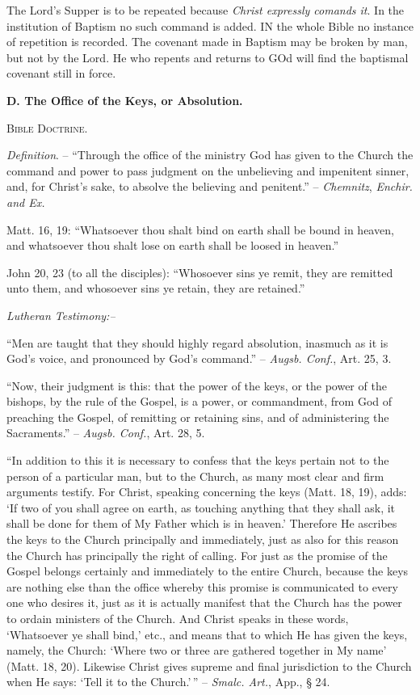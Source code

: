 \documentclass[
]{book}
\def\igobble#1{}
\begin{document}
The Lord's Supper is to be repeated because \emph{Christ expressly comands it}. In the institution of Baptism no such command is added. IN the whole Bible no instance of repetition is recorded. The covenant made in Baptism may be broken by man, but not by the Lord. He who repents and returns to GOd will find the baptismal covenant still in force.

\begin{center}
\textbf{D.  The Office of the Keys, or Absolution.}

\textsc{Bible Doctrine.}
\end{center}

\emph{Definition}. -- ``Through the office\index{Keys, Office of!zzzzz@\igobble|seealso{Absolution}} of the ministry God has given to the Church the command and power to pass judgment on the unbelieving and impenitent sinner, and, for Christ's sake, to absolve the believing and penitent.'' -- \emph{Chemnitz}, \emph{Enchir. and Ex.}

Matt. 16, 19: ``Whatsoever thou shalt bind on earth shall be bound in heaven, and whatsoever thou shalt lose on earth shall be loosed in heaven.''

John 20, 23 (to all the disciples): ``Whosoever sins ye remit, they are remitted unto them, and whosoever sins ye retain, they are retained.''

\begin{center}
\textsl{Lutheran Testimony:--}
\end{center}

``Men are taught that they should highly regard absolution, inasmuch as it is God's voice, and pronounced by God's command.'' -- \emph{Augsb. Conf.}, Art. 25, 3.

``Now, their judgment is this: that the power of the keys, or the power of the bishops, by the rule of the Gospel, is a power, or commandment, from God of preaching the Gospel, of remitting or retaining sins, and of administering the Sacraments.'' -- \emph{Augsb. Conf.}, Art. 28, 5.

``In addition to this it is necessary to confess that the keys pertain not to the person of a particular man, but to the Church, as many most clear and firm arguments testify. For Christ, speaking concerning the keys (Matt. 18, 19), adds: `If two of you shall agree on earth, as touching anything that they shall ask, it shall be done for them of My Father which is in heaven.' Therefore He ascribes the keys to the Church principally and immediately, just as also for this reason the Church has principally the right of calling. For just as the promise of the Gospel belongs certainly and immediately to the entire Church, because the keys are nothing else than the office whereby this promise is communicated to every one who desires it, just as it is actually manifest that the Church has the power to ordain ministers of the Church. And Christ speaks in these words, `Whatsoever ye shall bind,' etc., and means that to which He has given the keys, namely, the Church: `Where two or three are gathered together in My name' (Matt. 18, 20). Likewise Christ gives supreme and final jurisdiction to the Church when He says: `Tell it to the Church.'\,'' -- \emph{Smalc. Art.}, App., § 24.
\end{document}
